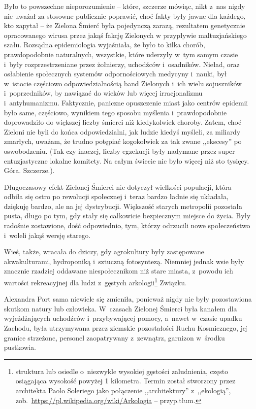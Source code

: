 \documentclass[oneside,polish,11pt,sfheadings]{mwbk}
\begin{document}
Było to powszechne nieporozumienie -- które, szczerze mówiąc, nikt z~nas
nigdy nie uważał za stosowne publicznie poprawić, choć fakty były jawne
dla każdego, kto zapytał -- że Zielona Śmierć była pojedynczą zarazą,
rezultatem genetycznie opracowanego wirusa przez jakąś fakcję Zielonych
w przypływie maltuzjańskiego szału. Rozsądna epidemiologia wyjaśniała,
że było to kilka chorób, prawdopodobnie naturalnych, wszystkie, które
uderzyły w~tym samym czasie i~były rozprzestrzeniane przez żołnierzy,
uchodźców i~osadników. Nieład, oraz osłabienie społecznych systemów
odpornościowych medycyny i~nauki, był w~istocie częściowo
odpowiedzialnością band Zielonych i~ich wielu sojuszników i~poprzedników, by nawiązać do wieków lub więcej irracjonalizmu i~antyhumanizmu. Faktycznie, paniczne opuszczenie miast jako centrów
epidemii było same, częściowo, wynikiem tego sposobu myślenia i~prawdopodobnie doprowadziło do większej liczby śmierci niż kiedykolwiek
choroby. Zatem, choć Zieloni nie byli do końca odpowiedzialni, jak
ludzie kiedyś myśleli, za miliardy zmarłych, uważam, że trudno potępiać
kogokolwiek za tak zwane ,,ekscesy'' po oswobodzeniu. (Tak czy inaczej,
liczby egzekucji były nadymane przez super entuzjastyczne lokalne
komitety. Na całym świecie nie było więcej niż sto tysięcy. Góra.
Szczerze.).

Długoczasowy efekt Zielonej Śmierci nie dotyczył wielkości populacji,
która odbiła się ostro po rewolucji społecznej i~teraz bardzo ładnie się
układała, dziękuję bardzo, ale na jej dystrybucji. Większość starych
metropolii pozostała pusta, długo po tym, gdy stały się całkowicie
bezpiecznym miejsce do życia. Były radośnie zostawione, dość
odpowiednio, tym, którzy odrzucili nowe społeczeństwo i~woleli jakąś
wersję starego.

Wieś, także, wracała do dziczy, gdy agrokultury były zastępowane
akwakulturami, hydroponiką i~sztuczną fotosyntezą. Niemniej jednak wsie
były znacznie rzadziej oddawane niespołecznikom niż stare miasta, z~powodu ich wartości rekreacyjnej dla ludzi z~gęstych
arkologii\footnote{struktura lub osiedle o~niezwykle wysokiej gęstości
zaludnienia, często osiągająca wysokość powyżej 1 kilometra. Termin
został stworzony przez architekta Paolo Soleriego jako połączenie
,,architektury'' z~,,ekologią'',
zob.~\url{https://pl.wikipedia.org/wiki/Arkologia} -- przyp.tłum.} Związku.

Alexandra Port sama niewiele się zmieniła, ponieważ nigdy nie były
pozostawiona skutkom natury lub człowieka. W~czasach Zielonej Śmierci
była kanałem dla wyjeżdżających uchodźców i~przybywającej pomocy, a~nawet w~czasie upadku Zachodu, była utrzymywana przez ziemskie
pozostałości Ruchu Kosmicznego, jej granice strzeżone, personel
zaopatrywany z~zewnątrz, garnizon w~środku pustkowia.
\end{document}
